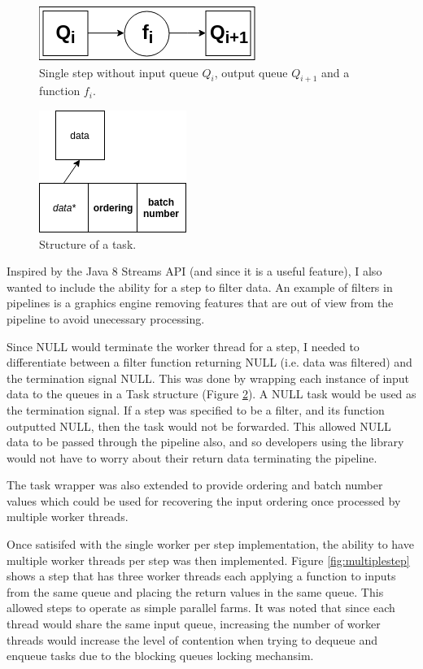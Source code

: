 \documentclass[12pt]{article}
\begin{document}
\begin{figure}[!ht]
	\centering 
	\includegraphics[width=0.45\linewidth]{images/step}
	\caption{Single step without input queue $Q_i$, output queue $Q_{i+1}$ and a function $f_i$.}
	\label{fig:step}
\end{figure}

\begin{figure}[!ht]
	\centering 
	\includegraphics[width=0.45\linewidth]{images/task}
	\caption{Structure of a task.}
	\label{fig:task}
\end{figure}

Inspired by the Java 8 Streams API (and since it is a useful feature), I also wanted to include the ability for a step to filter data. An example of filters in pipelines is a graphics engine removing features that are out of view from the pipeline to avoid unecessary processing. 

Since NULL would terminate the worker thread for a step, I needed to differentiate between a filter function returning NULL (i.e. data was filtered) and the termination signal NULL. This was done by wrapping each instance of input data to the queues in a Task structure (Figure \ref{fig:task}). A NULL task would be used as the termination signal. If a step was specified to be a filter, and its function outputted NULL, then the task would not be forwarded. This allowed NULL data to be passed through the pipeline also, and so developers using the library would not have to worry about their return data terminating the pipeline.

The task wrapper was also extended to provide ordering and batch number values which could be used for recovering the input ordering once processed by multiple worker threads. 

Once satisifed with the single worker per step implementation, the ability to have multiple worker threads per step was then implemented. Figure \ref{fig:multiplestep} shows a step that has three worker threads each applying a function to inputs from the same queue and placing the return values in the same queue. This allowed steps to operate as simple parallel farms. It was noted that since each thread would share the same input queue, increasing the number of worker threads would increase the level of contention when trying to dequeue and enqueue tasks due to the blocking queues locking mechansim. 
\end{document}
